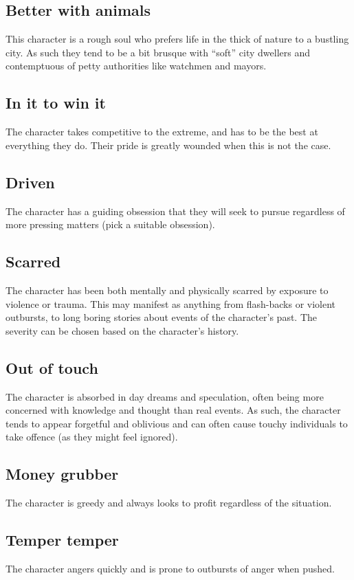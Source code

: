 \documentclass[a4paper,10pt,oneside]{book}
\begin{document}
\subsection{Better with animals}
This character is a rough soul who prefers life in the thick of nature to a bustling city. As such they tend to be a bit brusque with ``soft'' city dwellers and contemptuous of petty authorities like watchmen and mayors.

\subsection{In it to win it}
The character takes competitive to the extreme, and has to be the best at everything they do. Their pride is greatly wounded when this is not the case. 

\subsection{Driven}
The character has a guiding obsession that they will seek to pursue regardless of more pressing matters (pick a suitable obsession).

\subsection{Scarred}
The character has been both mentally and physically scarred by exposure to violence or trauma. This may manifest as anything from flash-backs or violent outbursts, to long boring stories about events of the character's past. The severity can be chosen based on the character's history.

\subsection{Out of touch}
The character is absorbed in day dreams and speculation, often being more concerned with knowledge and thought than real events. As such, the character tends to appear forgetful and oblivious and can often cause touchy individuals to take offence (as they might feel ignored).

\subsection{Money grubber}
The character is greedy and always looks to profit regardless of the situation.

\subsection{Temper temper}
The character angers quickly and is prone to outbursts of anger when pushed.
\end{document}
